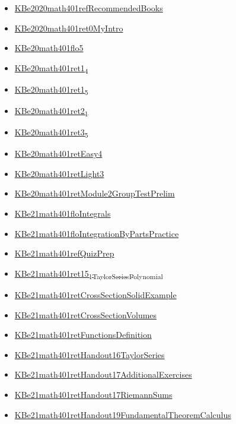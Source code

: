 \documentclass[11pt]{article}
\begin{document}
\begin{itemize}
\begin{itemize}
\item \href{math401/KBe2020math401refRecommendedBooks.org}{KBe2020math401refRecommendedBooks}
\item \href{math401/KBe2020math401ret0MyIntro.org}{KBe2020math401ret0MyIntro}
\item \href{math401/KBe20math401flo5.org}{KBe20math401flo5}
\item \href{math401/KBe20math401ret1\_4.org}{KBe20math401ret1\textsubscript{4}}
\item \href{math401/KBe20math401ret1\_5.org}{KBe20math401ret1\textsubscript{5}}
\item \href{math401/KBe20math401ret2\_1.org}{KBe20math401ret2\textsubscript{1}}
\item \href{math401/KBe20math401ret3\_5.org}{KBe20math401ret3\textsubscript{5}}
\item \href{math401/KBe20math401retEasy4.org}{KBe20math401retEasy4}
\item \href{math401/KBe20math401retLight3.org}{KBe20math401retLight3}
\item \href{math401/KBe20math401retModule2GroupTestPrelim.org}{KBe20math401retModule2GroupTestPrelim}
\item \href{math401/KBe21math401floIntegrals.org}{KBe21math401floIntegrals}
\item \href{math401/KBe21math401floIntegrationByPartsPractice.org}{KBe21math401floIntegrationByPartsPractice}
\item \href{math401/KBe21math401refQuizPrep.org}{KBe21math401refQuizPrep}
\item \href{math401/KBe21math401ret15\_1TaylorSeriesPolynomial.org}{KBe21math401ret15\textsubscript{1TaylorSeriesPolynomial}}
\item \href{math401/KBe21math401retCrossSectionSolidExample.org}{KBe21math401retCrossSectionSolidExample}
\item \href{math401/KBe21math401retCrossSectionVolumes.org}{KBe21math401retCrossSectionVolumes}
\item \href{math401/KBe21math401retFunctionsDefinition.org}{KBe21math401retFunctionsDefinition}
\item \href{math401/KBe21math401retHandout16TaylorSeries.org}{KBe21math401retHandout16TaylorSeries}
\item \href{math401/KBe21math401retHandout17AdditionalExercises.org}{KBe21math401retHandout17AdditionalExercises}
\item \href{math401/KBe21math401retHandout17RiemannSums.org}{KBe21math401retHandout17RiemannSums}
\item \href{math401/KBe21math401retHandout19FundamentalTheoremCalculus.org}{KBe21math401retHandout19FundamentalTheoremCalculus}

\end{itemize}
\end{itemize}
\end{document}
